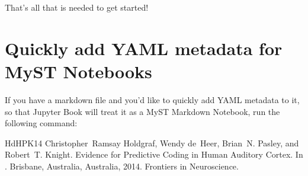 \documentclass[letterpaper,10pt,english]{jupyterBook}
\begin{document}
\sphinxAtStartPar
That’s all that is needed to get started!


\section{Quickly add YAML metadata for MyST Notebooks}
\label{\detokenize{markdown-notebooks:quickly-add-yaml-metadata-for-myst-notebooks}}
\sphinxAtStartPar
If you have a markdown file and you’d like to quickly add YAML metadata to it, so that Jupyter Book will treat it as a MyST Markdown Notebook, run the following command:

\begin{sphinxVerbatim}[commandchars=\\\{\}]
   
\end{sphinxVerbatim}

\begin{sphinxthebibliography}{HdHPK14}
\sphinxAtStartPar
Christopher Ramsay Holdgraf, Wendy de Heer, Brian N. Pasley, and Robert T. Knight. Evidence for Predictive Coding in Human Auditory Cortex. In . Brisbane, Australia, Australia, 2014. Frontiers in Neuroscience.
\end{sphinxthebibliography}







\renewcommand{\indexname}{Index}
\printindex
\end{document}
